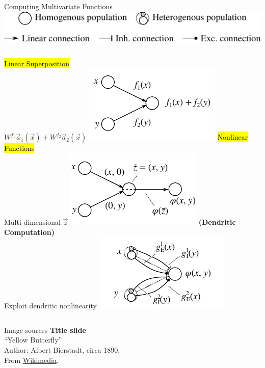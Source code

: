 \documentclass[handout,aspectratio=169]{beamer}
\begin{document}
	\begin{frame}{Computing Multivariate Functions}
		\centering
		\includegraphics{media/network_legend_3.pdf}\\[0.5cm]
		\begin{columns}[t]
			\centering
			\hl{Linear Superposition}\\[0.25cm]
			$W^{f_1} \vec a_1(\vec x) + W^{f_2} \vec a_2 (\vec x)$
			\includegraphics{media/network_a.pdf}
			\pause
			\centering
			\hl{Nonlinear Functions}\\[0.25cm]
			Multi-dimensional $\vec z$
			\includegraphics{media/network_c.pdf}
			\pause
			\centering
			\textbf{(Dendritic Computation)}\\[0.25cm]
			Exploit dendritic nonlinearity
			\includegraphics{media/network_d.pdf}
		\end{columns}
	\end{frame}

	\backupbegin
	
	\begin{frame}[noframenumbering]{Image sources}
		\small
		\textbf{Title slide}\\\enquote{Yellow Butterfly}\\Author: Albert Bierstadt, circa 1890.\\From \href{https://commons.wikimedia.org/wiki/File:Yellow_Butterfly_by_Albert_Bierstadt.jpeg}{Wikimedia}.
	\end{frame}


	\backupend
	
\end{document}
